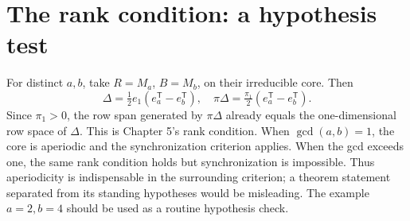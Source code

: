 
\section{The rank condition: a hypothesis test}
For distinct $a,b$, take $R=M_a$, $B=M_b$, on their irreducible core. Then
\[
 \Delta=\tfrac12e_1(e_a^{\mathsf T}-e_b^{\mathsf T}),
 \quad \pi\Delta=\tfrac{\pi_1}{2}(e_a^{\mathsf T}-e_b^{\mathsf T}).
\]
Since $\pi_1>0$, the row span generated by $\pi\Delta$ already equals
the one-dimensional row space of $\Delta$. This is Chapter 5's rank
condition. When $\gcd(a,b)=1$, the core is aperiodic and the synchronization
criterion applies. When the gcd exceeds one, the same rank condition holds
but synchronization is impossible. Thus aperiodicity is indispensable in
the surrounding criterion; a theorem statement separated from its standing
hypotheses would be misleading.
The example $a=2,b=4$ should be used as a routine hypothesis check.
